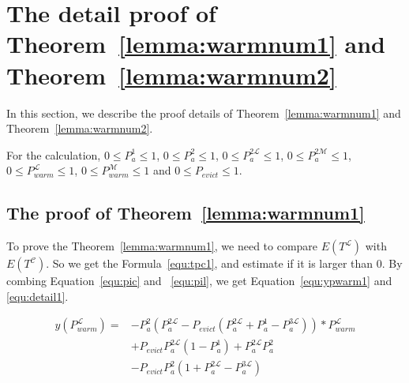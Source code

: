 \newpage
\section{The detail proof of Theorem~\ref{lemma:warmnum1} and Theorem~\ref{lemma:warmnum2}}
\label{appendixa}
In this section, we describe the proof details of Theorem~\ref{lemma:warmnum1} and Theorem~\ref{lemma:warmnum2}.

For the calculation, $0 \leq P_{a}^{\mathfrak{1}} \leq 1$, $0 \leq P_{a}^{\mathfrak{2}} \leq 1$, $0 \leq P_{a}^{\mathfrak{2}\mathcal{L}} \leq 1$, $0 \leq P_{a}^{\mathfrak{2}\mathcal{M}} \leq 1$, $0 \leq P_{warm}^{\mathcal{L}} \leq 1$, $0 \leq P_{warm}^{\mathcal{M}} \leq 1$
 and $0 \leq P_{evict} \leq 1$.

\subsection{The proof of Theorem~\ref{lemma:warmnum1}}
To prove the Theorem~\ref{lemma:warmnum1}, we need to compare $E(T^{\mathcal{L}})$ with $E(T^{\mathcal{C}})$.
So we get the Formula~\ref{equ:tpc1}, and estimate if it is larger than $0$.
By combing Equation~\ref{equ:pic} and ~\ref{equ:pil}, we get Equation~\ref{equ:ypwarm1} and \ref{equ:detail1}.

\begin{equation}
\label{equ:ypwarm1}
\begin{split}
y(P_{warm}^{\mathcal{L}}) =& -P_{a}^{\mathfrak{2}}(P_{a}^{\mathfrak{2}\mathcal{L}}-P_{evict}(P_{a}^{\mathfrak{2}\mathcal{L}}+P_{a}^{\mathfrak{1}}-P_{a}^{\mathfrak{3}\mathcal{L}}))*P_{warm}^{\mathcal{L}} \\
& +  P_{evict}P_{a}^{\mathfrak{2}\mathcal{L}}(1-P_{a}^{\mathfrak{1}})+P_{a}^{\mathfrak{2}\mathcal{L}}P_{a}^{\mathfrak{2}}\\
& - P_{evict}P_{a}^{\mathfrak{2}}(1+P_{a}^{\mathfrak{2}\mathcal{L}}-P_{a}^{\mathfrak{3}\mathcal{L}}) \,
\end{split}\end{equation}

